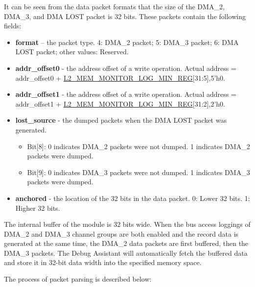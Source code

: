 \documentclass[main\_\_EN.tex]{subfiles}
\begin{document}
It can be seen from the data packet formats that the size of the DMA\_2, DMA\_3, and DMA LOST packet is 32 bits. These packets contain the following fields:

\begin{itemize}
    \item {\bfseries format} – the packet type. 4: DMA\_2 packet; 5: DMA\_3 packet; 6: DMA LOST packet; other values: Reserved.
    \item {\bfseries addr\_offset0} - the address offset of a write operation. Actual address = addr\_offset0 + {\hyperref[regdesc:L2MEMMONITORLOGMINREG]{L2\_MEM\_MONITOR\_LOG\_MIN\_REG}[31:5],5'h0}.
    \item {\bfseries addr\_offset1} - the address offset of a write operation. Actual address = addr\_offset1 + {\hyperref[regdesc:L2MEMMONITORLOGMINREG]{L2\_MEM\_MONITOR\_LOG\_MIN\_REG}[31:2],2'h0}.
    \item {\bfseries lost\_source} - the dumped packets when the DMA LOST packet was generated.
    \begin{itemize}
        \item Bit[8]: 0 indicates DMA\_2 packets were not dumped. 1 indicates DMA\_2 packets were dumped.
        \item Bit[9]: 0 indicates DMA\_3 packets were not dumped. 1 indicates DMA\_3 packets were dumped.
    \end{itemize}
    \item {\bfseries anchored} - the location of the 32 bits in the data packet. 0: Lower 32 bits. 1: Higher 32 bits.
\end{itemize}

The internal buffer of the module is 32 bits wide. When the bus access loggings of DMA\_2 and DMA\_3 channel groups are both enabled and the record data is generated at the same time, the DMA\_2 data packets are first buffered, then the DMA\_3 packets. The Debug Assistant will automatically fetch the buffered data and store it in 32-bit data width into the specified memory space.

The process of packet parsing is described below:
\end{document}
